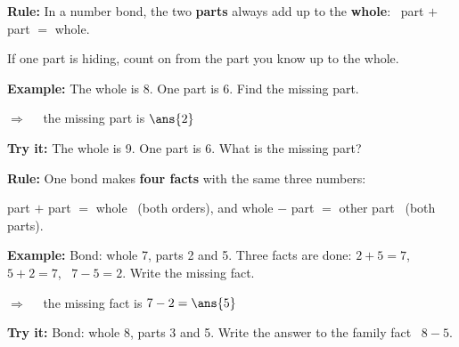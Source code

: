 \documentclass[12pt]{article}
\begin{document}


\begin{formulabox}
\textbf{Rule:} In a number bond, the two \textbf{parts} always add up to the
\textbf{whole}: \ part $+$ part $=$ whole.\par
If one part is hiding, count on from the part you know up to the whole.
\end{formulabox}

\begin{examplebox}
\textbf{Example:} \quad The whole is 8. One part is 6. Find the missing part.

$\Rightarrow\quad$ the missing part is $\ans{2}$
\end{examplebox}

\begin{tryitbox}
\textbf{Try it:} \quad The whole is 9. One part is 6. What is the missing
part?\\[2pt]
\end{tryitbox}


\begin{formulabox}
\textbf{Rule:} One bond makes \textbf{four facts} with the same three
numbers:\par
part $+$ part $=$ whole \ (both orders), and whole $-$ part $=$ other part
\ (both parts).
\end{formulabox}

\begin{examplebox}
\textbf{Example:} \quad Bond: whole 7, parts 2 and 5. Three facts are done:
$2+5=7$, \ $5+2=7$, \ $7-5=2$. Write the missing fact.

$\Rightarrow\quad$ the missing fact is $7 - 2 = \ans{5}$
\end{examplebox}

\begin{tryitbox}
\textbf{Try it:} \quad Bond: whole 8, parts 3 and 5. Write the answer to the
family fact \ $8 - 5$.\\[2pt]
\end{tryitbox}
\end{document}
